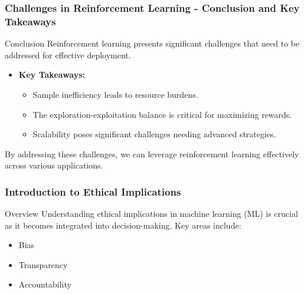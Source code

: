\documentclass[aspectratio=169]{beamer}
\begin{document}
\begin{frame}[fragile]
    \frametitle{Challenges in Reinforcement Learning - Conclusion and Key Takeaways}
    \begin{block}{Conclusion}
        Reinforcement learning presents significant challenges that need to be addressed for effective deployment.
    \end{block}
    \begin{itemize}
        \item \textbf{Key Takeaways:}
        \begin{itemize}
            \item Sample inefficiency leads to resource burdens.
            \item The exploration-exploitation balance is critical for maximizing rewards.
            \item Scalability poses significant challenges needing advanced strategies.
        \end{itemize}
    \end{itemize}
    By addressing these challenges, we can leverage reinforcement learning effectively across various applications.
\end{frame}

\begin{frame}[fragile]
    \frametitle{Introduction to Ethical Implications}
    \begin{block}{Overview}
        Understanding ethical implications in machine learning (ML) is crucial as it becomes integrated into decision-making. 
        Key areas include:
        \begin{itemize}
            \item Bias
            \item Transparency
            \item Accountability
        \end{itemize}
    \end{block}
\end{frame}
\end{document}

